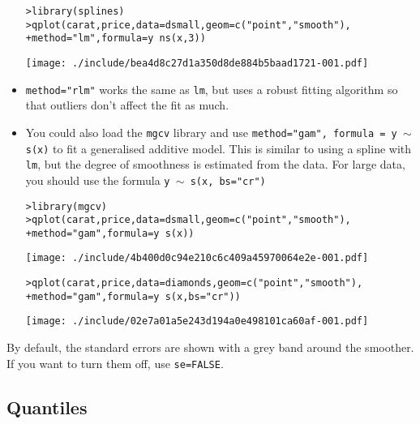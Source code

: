 \begin{itemize}
\begin{alltt}
> library(splines)
> qplot(carat, price, data = dsmall, geom = c("point", "smooth"), 
+     method = "lm", formula = y ~ ns(x, 3))
\end{alltt}
\texttt{[image: ./include/bea4d8c27d1a350d8de884b5baad1721-001.pdf]}
\begin{alltt}

\end{alltt}

	\item {\tt method="rlm"} works the same as {\tt lm}, but uses a robust fitting algorithm so that outliers don't affect the fit as much.

	\item You could also load the {\tt mgcv} library and use {\tt method="gam", formula = y $\sim$ s(x)} to fit a generalised additive model.  This is similar 
to using a spline with {\tt lm}, but the degree of smoothness is estimated from the data.  For large data, you should use the formula {\tt y $\sim$ s(x, bs="cr")}
 
\begin{alltt}
> library(mgcv)
> qplot(carat, price, data = dsmall, geom = c("point", "smooth"), 
+     method = "gam", formula = y ~ s(x))
\end{alltt}
\texttt{[image: ./include/4b400d0c94e210c6c409a45970064e2e-001.pdf]}
\begin{alltt}

> qplot(carat, price, data = diamonds, geom = c("point", "smooth"), 
+     method = "gam", formula = y ~ s(x, bs = "cr"))
\end{alltt}
\texttt{[image: ./include/02e7a01a5e243d194a0e498101ca60af-001.pdf]}
\begin{alltt}

\end{alltt}

\end{itemize}

By default, the standard errors are shown with a grey band around the smoother.  If you want to turn them off, use {\tt se=FALSE}.

\subsection{Quantiles}\label{sub:quantiles}

